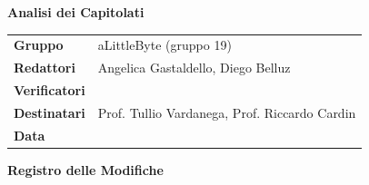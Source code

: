 \documentclass[a4paper,12pt]{article}
\begin{document}
\thispagestyle{firstpage}

\vspace*{0.5cm}

\begin{center}
    {\LARGE \textbf{Analisi dei Capitolati}}
\end{center}

\vspace{1.5cm}

\begin{center}
    \renewcommand{\arraystretch}{1.3}
    \begin{tcolorbox}[
        width=0.92\textwidth,
        colback=gray!6,
        colframe=gray!45,
        boxrule=0.5pt,
        arc=2mm,
        boxsep=0pt,
        left=8pt, right=8pt, top=8pt, bottom=8pt
    ]
        \begin{tabularx}{\linewidth}{>{\bfseries}p{3.5cm} X}
            Gruppo      & aLittleByte (gruppo 19) \\
            Redattori   & Angelica Gastaldello, Diego Belluz \\
            Verificatori& \\
            Destinatari & Prof. Tullio Vardanega, Prof. Riccardo Cardin \\
            Data        & \\
        \end{tabularx}
    \end{tcolorbox}
\end{center}

\newpage


\begin{center}
    {\Large \textbf{Registro delle Modifiche}}
\end{center}

\vspace{0.35cm}
\end{document}
